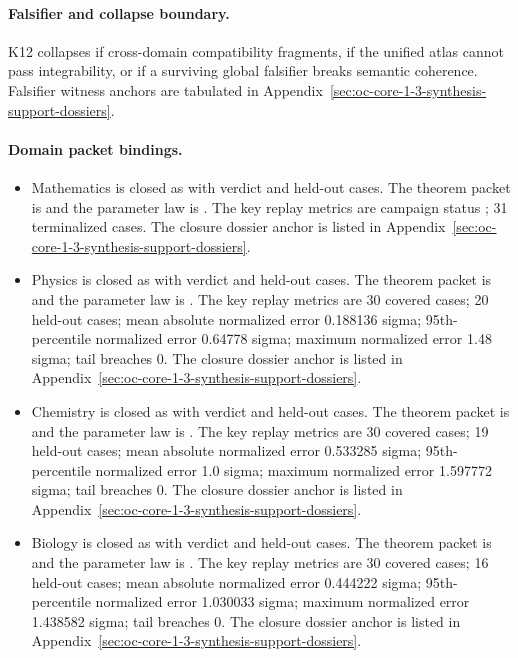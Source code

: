 \paragraph{Falsifier and collapse boundary.}
K12 collapses if cross-domain compatibility fragments, if the unified atlas cannot pass integrability, or if a surviving global falsifier breaks semantic coherence.
Falsifier witness anchors are tabulated in Appendix~\ref{sec:oc-core-1-3-synthesis-support-dossiers}.

\paragraph{Domain packet bindings.}
\begin{itemize}[leftmargin=1.6em,nosep]
\item Mathematics is closed as  with verdict  and  held-out cases. The theorem packet is  and the parameter law is . The key replay metrics are campaign status ; 31 terminalized cases. The closure dossier anchor is listed in Appendix~\ref{sec:oc-core-1-3-synthesis-support-dossiers}.
\item Physics is closed as  with verdict  and  held-out cases. The theorem packet is  and the parameter law is . The key replay metrics are 30 covered cases; 20 held-out cases; mean absolute normalized error 0.188136 sigma; 95th-percentile normalized error 0.64778 sigma; maximum normalized error 1.48 sigma; tail breaches 0. The closure dossier anchor is listed in Appendix~\ref{sec:oc-core-1-3-synthesis-support-dossiers}.
\item Chemistry is closed as  with verdict  and  held-out cases. The theorem packet is  and the parameter law is . The key replay metrics are 30 covered cases; 19 held-out cases; mean absolute normalized error 0.533285 sigma; 95th-percentile normalized error 1.0 sigma; maximum normalized error 1.597772 sigma; tail breaches 0. The closure dossier anchor is listed in Appendix~\ref{sec:oc-core-1-3-synthesis-support-dossiers}.
\item Biology is closed as  with verdict  and  held-out cases. The theorem packet is  and the parameter law is . The key replay metrics are 30 covered cases; 16 held-out cases; mean absolute normalized error 0.444222 sigma; 95th-percentile normalized error 1.030033 sigma; maximum normalized error 1.438582 sigma; tail breaches 0. The closure dossier anchor is listed in Appendix~\ref{sec:oc-core-1-3-synthesis-support-dossiers}.

\end{itemize}
